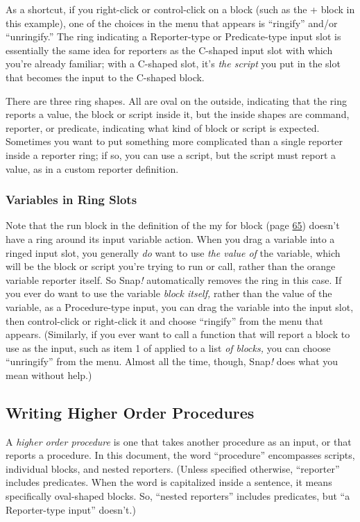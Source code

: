 As a shortcut, if you right-click or control-click on a block (such as
the + block in this example), one of the choices in the menu that
appears is ``ringify'' and/or ``unringify.'' The ring indicating a
Reporter-type or Predicate-type input slot is essentially the same idea
for reporters as the C-shaped input slot with which you're already
familiar; with a C-shaped slot, it's \emph{the script} you put in the
slot that becomes the input to the C-shaped block.

There are three ring shapes. All are oval on the outside, indicating
that the ring reports a value, the block or script inside it, but the
inside shapes are command, reporter, or predicate, indicating what kind
of block or script is expected. Sometimes you want to put something more
complicated than a single reporter inside a reporter ring; if so, you
can use a script, but the script must report a value, as in a custom
reporter definition.

\subsubsection{Variables in Ring Slots}\label{variables-in-ring-slots}

Note that the run block in the definition of the my for block (page
\hyperref[call-and-run]{65}) doesn't have a ring around its input
variable action. When you drag a variable into a ringed input slot, you
generally \emph{do} want to use \emph{the value of} the variable, which
will be the block or script you're trying to run or call, rather than
the orange variable reporter itself. So Snap\emph{!} automatically
removes the ring in this case. If you ever do want to use the variable
\emph{block itself,} rather than the value of the variable, as a
Procedure-type input, you can drag the variable into the input slot,
then control-click or right-click it and choose ``ringify'' from the
menu that appears. (Similarly, if you ever want to call a function that
will report a block to use as the input, such as item 1 of applied to a
list \emph{of blocks,} you can choose ``unringify'' from the menu.
Almost all the time, though, Snap\emph{!} does what you mean without
help.)

\subsection{Writing Higher Order
Procedures}\label{writing-higher-order-procedures}

A \emph{higher order procedure} is one that takes another procedure as
an input, or that reports a procedure. In this document, the word
``procedure'' encompasses scripts, individual blocks, and nested
reporters. (Unless specified otherwise, ``reporter'' includes
predicates. When the word is capitalized inside a sentence, it means
specifically oval-shaped blocks. So, ``nested reporters'' includes
predicates, but ``a Reporter-type input'' doesn't.)


